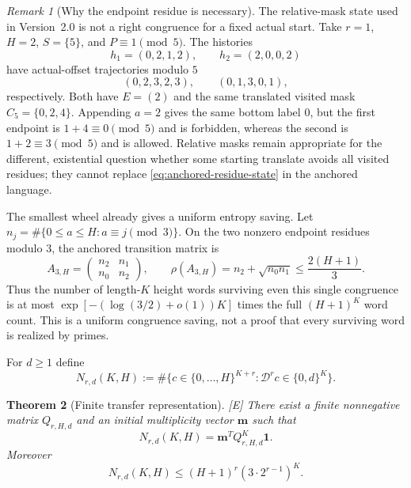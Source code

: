 \documentclass[11pt]{article}
\newtheorem{theorem}{Theorem}[section]
\theoremstyle{definition}
\theoremstyle{remark}
\newtheorem{remark}[theorem]{Remark}
\newcommand{\Dabs}{\mathcal D}
\newcommand{\status}[1]{\textnormal{\textcolor{accent}{\footnotesize[#1]}}}
\begin{document}
\begin{remark}[Why the endpoint residue is necessary]
\label{rem:bisimulation-counterexample}
The relative-mask state used in Version~2.0 is not a right congruence for a fixed actual
start.  Take $r=1$, $H=2$, $S=\{5\}$, and $P\equiv1\pmod5$.  The histories
\[
 h_1=(0,2,1,2),\qquad h_2=(2,0,0,2)
\]
have actual-offset trajectories modulo $5$
\[
 (0,2,3,2,3),\qquad(0,1,3,0,1),
\]
respectively.  Both have $E=(2)$ and the same translated visited mask
$C_5=\{0,2,4\}$.  Appending $a=2$ gives the same bottom label $0$, but the first
endpoint is $1+4\equiv0\pmod5$ and is forbidden, whereas the second is
$1+2\equiv3\pmod5$ and is allowed.  Relative masks remain appropriate for the
different, existential question whether some starting translate avoids all visited
residues; they cannot replace \eqref{eq:anchored-residue-state} in the anchored
language.
\end{remark}

The smallest wheel already gives a uniform entropy saving.  Let
$n_j=\#\{0\le a\le H:a\equiv j\pmod3\}$.  On the two nonzero endpoint residues
modulo $3$, the anchored transition matrix is
\begin{equation}\label{eq:mod3-wheel-matrix}
 A_{3,H}=\begin{pmatrix}n_2&n_1\\n_0&n_2\end{pmatrix},
 \qquad
 \rho(A_{3,H})=n_2+\sqrt{n_0n_1}\le\frac{2(H+1)}3.
\end{equation}
Thus the number of length-$K$ height words surviving even this single congruence is at
most $\exp[-(\log(3/2)+o(1))K]$ times the full $(H+1)^K$ word count.  This is a
uniform congruence saving, not a proof that every surviving word is realized by primes.

For $d\ge1$ define
\begin{equation}\label{eq:N-rd}
 N_{r,d}(K,H):=
 \#\{c\in\{0,\ldots,H\}^{K+r}:\Dabs^rc\in\{0,d\}^{K}\}.
\end{equation}

\begin{theorem}[Finite transfer representation]\label{thm:transfer}
\status{E}
There exist a finite nonnegative matrix $Q_{r,H,d}$ and an initial multiplicity vector
$\mathbf m$ such that
\begin{equation}\label{eq:transfer}
 N_{r,d}(K,H)=\mathbf m^{\!T}Q_{r,H,d}^{K}\mathbf1.
\end{equation}
Moreover
\begin{equation}\label{eq:transfer-branch}
 N_{r,d}(K,H)\le(H+1)^r(3\cdot2^{r-1})^K.
\end{equation}
\end{theorem}
\end{document}
